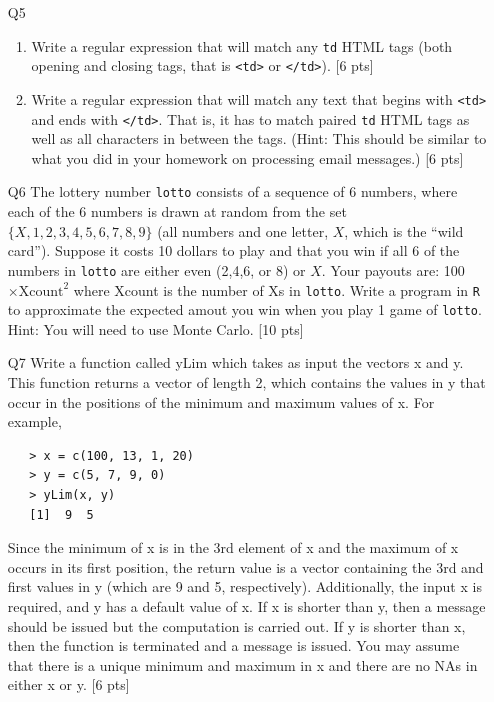 \documentclass[12pt]{article}
\theoremstyle{Conjecture}
\theoremstyle{example}
\theoremstyle{remark}
\theoremstyle{lemma}
\theoremstyle{definition}
\theoremstyle{corol}
\theoremstyle{proposition}
\theoremstyle{condition}
\begin{document}
\begin{enumerate}
\item [Q5]
\begin{enumerate}
  \item Write a regular expression that will match any \texttt{td} HTML tags (both opening and closing tags, that is \texttt{<td>} or \texttt{</td>}). [6 pts]
  \vspace{1in}
  \item Write a regular expression that will match any text that begins with \texttt{<td>} and ends with \texttt{</td>}. That is, it has to match paired \texttt{td} HTML tags as well as all characters in between the tags. (Hint: This should be similar to what you did in your homework on processing email messages.) [6 pts]
\end{enumerate}
\newpage 

\item [Q6] The lottery number {\tt lotto} consists of a sequence of 6
  numbers, where each of the 6 numbers is drawn at random from the set
  $\{X, 1,2,3,4,5,6,7,8,9\}$ (all numbers and one letter, $X$, which
  is the ``wild card''). Suppose it costs 10 dollars to play and that
  you win if all 6 of the numbers in {\tt lotto} are either even
  (2,4,6, or 8) or $X$. Your payouts are: 100$\times\mbox{Xcount}^2$
  where Xcount is the number of Xs in {\tt lotto}. Write a program in
  {\tt R} to approximate the expected amout you win when you play 1
  game of {\tt lotto}.  Hint: You will need to use Monte Carlo. [10 pts]
  \newpage

\item [Q7] Write a function called yLim which takes as input the 
  vectors x and y. This function returns a vector of length 2, which 
  contains the values in y that occur in the positions of the minimum 
  and maximum values of x. For example, 
\begin{verbatim}
   > x = c(100, 13, 1, 20) 
   > y = c(5, 7, 9, 0) 
   > yLim(x, y) 
   [1]  9  5 
\end{verbatim}
  Since the minimum of x is in the 3rd element of x and the maximum of
  x occurs in its first position, the return value is a vector
  containing the 3rd and first values in y (which are 9 and 5,
  respectively).  Additionally, the input x is required, and y has a
  default value of x. If x is shorter than y, then a message should be
  issued but the computation is carried out. If y is shorter than x,
  then the function is terminated and a message is issued. You may
  assume that there is a unique minimum and maximum in x and there are
  no NAs in either x or y. [6 pts]


\end{enumerate}
\end{document}
